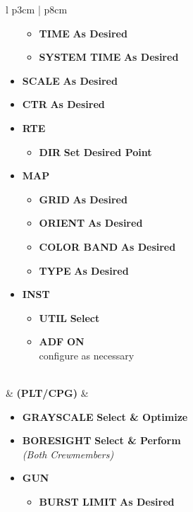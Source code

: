 \documentclass[fontHelvetica]{TechCheck}
\begin{document}
\begin{center}
\begin{longtable}{l p{3cm} | p{8cm}}
\begin{minipage}[t]{\linewidth}
\begin{itemize}
\begin{itemize}
						\item \textbf{TIME} \dotfill \textbf{As Desired}
						\item \textbf{SYSTEM TIME} \dotfill \textbf{As Desired}
					\end{itemize}
					\item \textbf{SCALE} \dotfill \textbf{As Desired}
					\item \textbf{CTR} \dotfill \textbf{As Desired}
					\item \textbf{RTE}
					\begin{itemize}
						\item \textbf{DIR} \dotfill \textbf{Set Desired Point}
					\end{itemize}
					\item \textbf{MAP}
					\begin{itemize}
						\item \textbf{GRID} \dotfill \textbf{As Desired}
						\item \textbf{ORIENT} \dotfill \textbf{As Desired}
						\item \textbf{COLOR BAND} \dotfill \textbf{As Desired}
						\item \textbf{TYPE} \dotfill \textbf{As Desired}
					\end{itemize}
					\item \textbf{INST}
					\begin{itemize}
						\item \textbf{UTIL} \dotfill \textbf{Select}
						\item \textbf{ADF} \dotfill \textbf{ON} \\
						\hfill configure as necessary
					\end{itemize}
				\end{itemize}
			\end{minipage} \\
			\midrule
			\textbf{\textbullet} &  \textbf{(PLT/CPG)} &
			\begin{minipage}[t]{\linewidth}
				\begin{itemize}
					\item \textbf{GRAYSCALE} \dotfill \textbf{Select \& Optimize}
					\item \textbf{BORESIGHT} \dotfill \textbf{Select \& Perform} \\
					\hfill \emph{(Both Crewmembers)}
					\item \textbf{GUN}
					\begin{itemize}
						\item \textbf{BURST LIMIT} \dotfill \textbf{As Desired}

\end{itemize}
\end{itemize}
\end{minipage}
\end{longtable}
\end{center}
\end{document}
